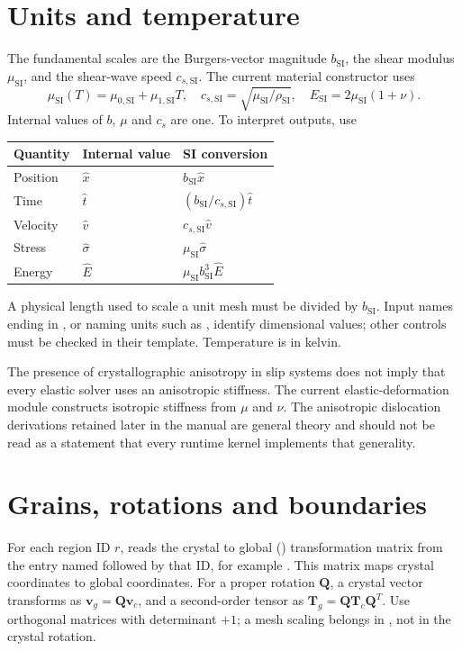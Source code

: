 \section{Units and temperature}
The fundamental scales are the Burgers-vector magnitude $b_{\mathrm{SI}}$, the shear modulus $\mu_{\mathrm{SI}}$, and the shear-wave speed $c_{s,\mathrm{SI}}$. The current material constructor uses
\begin{equation}
\mu_{\mathrm{SI}}(T)=\mu_{0,\mathrm{SI}}+\mu_{1,\mathrm{SI}}T,
\quad c_{s,\mathrm{SI}}=\sqrt{\mu_{\mathrm{SI}}/\rho_{\mathrm{SI}}},
\quad E_{\mathrm{SI}}=2\mu_{\mathrm{SI}}(1+\nu).
\end{equation}
Internal values of $b$, $\mu$ and $c_s$ are one. To interpret outputs, use
\begin{center}
\begin{tabular}{lll}\toprule
Quantity & Internal value & SI conversion\\\midrule
Position & $\hat x$ & $b_{\mathrm{SI}}\hat x$\\
Time & $\hat t$ & $(b_{\mathrm{SI}}/c_{s,\mathrm{SI}})\hat t$\\
Velocity & $\hat v$ & $c_{s,\mathrm{SI}}\hat v$\\
Stress & $\hat\sigma$ & $\mu_{\mathrm{SI}}\hat\sigma$\\
Energy & $\hat E$ & $\mu_{\mathrm{SI}}b_{\mathrm{SI}}^3\hat E$\\\bottomrule
\end{tabular}
\end{center}
A physical length used to scale a unit mesh must be divided by $b_{\mathrm{SI}}$. Input names ending in , or naming units such as , identify dimensional values; other controls must be checked in their template. Temperature is in kelvin.

The presence of crystallographic anisotropy in slip systems does not imply that every elastic solver uses an anisotropic stiffness. The current elastic-deformation module constructs isotropic stiffness from $\mu$ and $\nu$. The anisotropic dislocation derivations retained later in the manual are general theory and should not be read as a statement that every runtime kernel implements that generality.

\section{Grains, rotations and boundaries}
For each region ID $r$,  reads the crystal to global () transformation matrix from the entry named  followed by that ID, for example . This matrix maps crystal coordinates to global coordinates. For a proper rotation $\bm Q$, a crystal vector transforms as $\bm v_g=\bm Q\bm v_c$, and a second-order tensor as $\bm T_g=\bm Q\bm T_c\bm Q^T$. Use orthogonal matrices with determinant $+1$; a mesh scaling belongs in , not in the crystal rotation.

